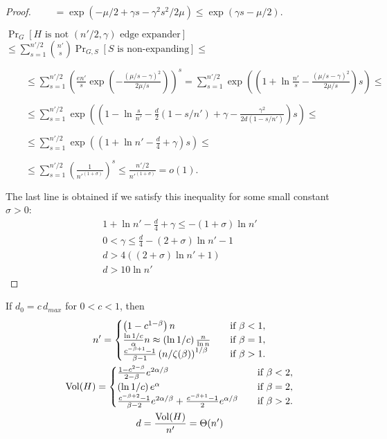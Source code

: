 \begin{proof}
    $\qquad=\exp(-\mu/2+\gamma s-\gamma^2s^2/2\mu)\leq\exp(\gamma s-\mu/2)$.
    
    $\Pr_G[H\text{ is not }(n'/2,\gamma)\text{ edge expander}]$
    $\leq\sum_{s=1}^{n'/2}{\binom{n'}{s}\Pr_{G,S}[S\text{ is non-expanding}]}\leq$
    
    $\qquad\leq\sum_{s=1}^{n'/2}{\left(\frac{en'}{s}\exp\left(-\frac{(\mu/s-\gamma)^2}{2\mu/s}\right)\right)^s}
    =\sum_{s=1}^{n'/2}{\exp\left(\left(1+\ln\frac{n'}{s}-\frac{(\mu/s-\gamma)^2}{2\mu/s}\right)s\right)}\leq$
    
    $\qquad\leq\sum_{s=1}^{n'/2}{\exp\left(\left(
        1
        -\ln\frac{s}{n'}
        -\frac{d}{2}\left(1-s/n'\right)
        +\gamma
        -\frac{\gamma^2}{2d\left(1-s/n'\right)}
    \right)s\right)}\leq$
    
    $\qquad\leq\sum_{s=1}^{n'/2}{\exp\left(\left(
        1+\ln n'
        -\frac{d}{4}
        +\gamma
    \right)s\right)}\leq$
    
    $\qquad\leq\sum_{s=1}^{n'/2}{\left(\frac{1}{n'^{(1+\sigma)}}\right)^s}\leq\frac{n'/2}{n'^{(1+\sigma)}}=o(1).$
    
    The last line is obtained if we satisfy this inequality
    for some small constant $\sigma>0$:
    \begin{gather*}
        1+\ln n'-\frac{d}{4}+\gamma\leq-(1+\sigma)\ln n'\\
        0<\gamma\leq\frac{d}{4}-(2+\sigma)\ln n'-1\\
        d>4\left((2+\sigma)\ln n'+1\right)\\
        d>10\ln n'
    \end{gather*}
\end{proof}

\begin{lemma}
    \label{lem:powerlaw-coin-toss-size-vol-of-h}
    If $d_0=c\,d_{max}$ for $0<c<1$, then
    \begin{gather}
        n'=
        \begin{cases}
            \left(1-c^{1-\beta}\right)n & \quad \text{if } \beta<1,\\
            \frac{\ln 1/c}{\alpha}n\approx\left(\ln 1/c\right)\frac{n}{\ln n} & \quad \text{if } \beta=1,\\
            \frac{c^{-\beta+1}-1}{\beta-1}\left(n/\zeta(\beta)\right)^{1/\beta} & \quad \text{if } \beta>1. %
        \end{cases}\\
        \Vol(H)=
        \begin{cases}
            \frac{1-c^{2-\beta}}{2-\beta}e^{2\alpha/\beta} & \quad \text{if } \beta<2,\\
            \left(\ln 1/c\right)e^\alpha & \quad \text{if } \beta=2,\\
            \frac{c^{-\beta+2}-1}{\beta-2}e^{2\alpha/\beta}+\frac{c^{-\beta+1}-1}{2}e^{\alpha/\beta} & \quad \text{if } \beta>2.
        \end{cases}\\
        d=\frac{\Vol(H)}{n'}=\Theta(n')
    \end{gather}
\end{lemma}

